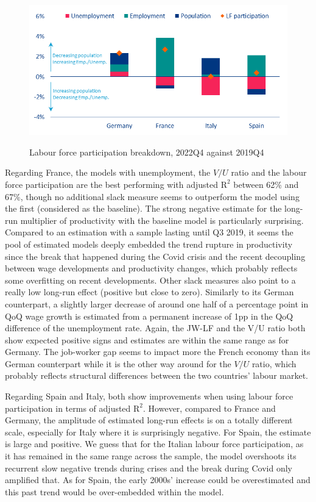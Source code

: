 \begin{figure}[H]
    \centering
    \caption{Labour force participation breakdown, 2022Q4 against 2019Q4}
    \includegraphics[width=.7\textwidth]{Core/2.Labour/img/lfpart breakdown.png}
    \label{figure:lfpart}
\end{figure}

Regarding France, the models with unemployment, the $V/U$ ratio and the labour force participation are the best performing with adjusted $\textrm{R}^{2}$ between 62\% and 67\%, though no additional slack measure seems to outperform the model using the first (considered as the baseline). 
The strong negative estimate for the long-run multiplier of productivity with the baseline model is particularly surprising. 
Compared to an estimation with a sample lasting until Q3 2019, it seems the pool of estimated models deeply embedded the trend rupture in productivity since the break that happened during the Covid crisis and the recent decoupling between wage developments and productivity changes, which probably reflects some overfitting on recent developments. 
Other slack measures also point to a really low long-run effect (positive but close to zero). 
Similarly to its German counterpart, a slightly larger decrease of around one half of a percentage point in QoQ wage growth is estimated from a permanent increase of 1pp in the QoQ difference of the unemployment rate. 
Again, the JW-LF and the V/U ratio both show expected positive signs and estimates are within the same range as for Germany. 
The job-worker gap seems to impact more the French economy than its German counterpart while it is the other way around for the $V/U$ ratio, which probably reflects structural differences between the two countries’ labour market. 

Regarding Spain and Italy, both show improvements when using labour force participation in terms of adjusted $\textrm{R}^{2}$. 
However, compared to France and Germany, the amplitude of estimated long-run effects is on a totally different scale, especially for Italy where it is surprisingly negative. 
For Spain, the estimate is large and positive. 
We guess that for the Italian labour force participation, as it has remained in the same range across the sample, the model overshoots its recurrent slow negative trends during crises and the break during Covid only amplified that. 
As for Spain, the early 2000s’ increase could be overestimated and this past trend would be over-embedded within the model. 

